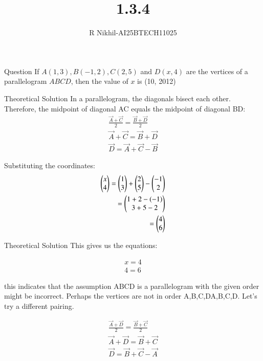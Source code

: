 \documentclass{beamer}
\title %
{1.3.4}
\author %
{R Nikhil-AI25BTECH11025}
\begin{document}
\frame{\titlepage}
\begin{frame}{Question}
If $ A(1, 3), B(-1, 2), C(2, 5) $ and $ D(x, 4) $ are the vertices of a parallelogram \( ABCD \), then the value of $x$ is \underline{\hspace{2cm}}(10, 2012)
\end{frame}

\begin{frame}{Theoretical Solution}
In a parallelogram, the diagonals bisect each other. Therefore, the midpoint of diagonal AC equals the midpoint of diagonal BD:
\begin{align}
\frac{\vec{A} +\vec{C}}{2} = \frac{\vec{B} + \vec{D}}{2} \\
\vec{A} + \vec{C} = \vec{B} + \vec{D} \\
\vec{D} = \vec{A} + \vec{C} - \vec{B}
\end{align}

Substituting the coordinates:
\begin{align}
\begin{pmatrix} x \\ 4 \end{pmatrix} = \begin{pmatrix} 1 \\ 3 \end{pmatrix} + \begin{pmatrix} 2 \\ 5 \end{pmatrix} - \begin{pmatrix} -1 \\ 2 \end{pmatrix} \\
                 = \begin{pmatrix} 1 + 2 - (-1) \\ 3 + 5 - 2 \end{pmatrix} \\
                 = \begin{pmatrix} 4 \\ 6 \end{pmatrix}
\end{align}
\end{frame}

\begin{frame}{Theoretical Solution}
This gives us the equations: 

\begin{align}
       x=4\\
       4=6
\end{align}

this indicates that the assumption ABCD is a parallelogram with the given order might be incorrect. Perhaps the vertices are not in order A,B,C,DA,B,C,D. Let's try a different pairing.



\begin{align}
\frac{\vec{A} + \vec{D}}{2} = \frac{\vec{B} + \vec{C}}{2} \\
\vec{A} + \vec{D} = \vec{B} + \vec{C} \\
\vec{D} = \vec{B} + \vec{C} - \vec{A}
\end{align}
\end{frame}
\end{document}
